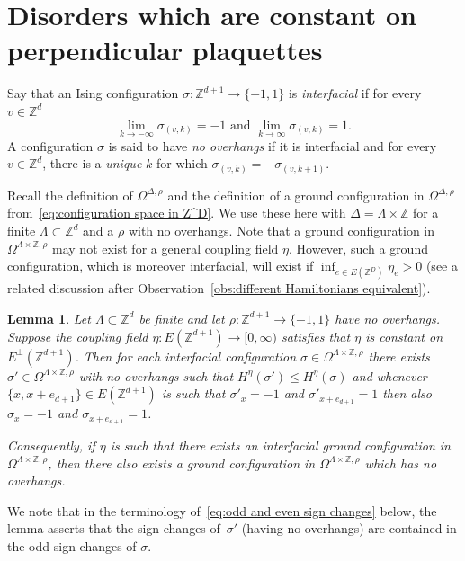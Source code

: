 \documentclass[11pt, reqno]{amsart}
\newtheorem{lemma}[theorem]{Lemma}
\newcommand{\Z}{\mathbb{Z}}
\numberwithin{equation}{section}
\begin{document}
\section{Disorders which are constant on perpendicular plaquettes}
\label{sec:Disorders which are constant on transversal plaquettes}

Say that an Ising configuration $\sigma\colon \Z^{d+1}\to\{-1,1\}$ is \emph{interfacial} if for every $v\in\Z^d$
\begin{equation}
\text{$\lim_{k\to-\infty}\sigma_{(v,k)}=-1$ and $\lim_{k\to\infty}\sigma_{(v,k)}=1$}.
\end{equation}
A configuration $\sigma$ is said to have \emph{no overhangs} if it is interfacial and for every $v\in\Z^d$, there is a \emph{unique} $k$ for which $\sigma_{(v,k)}=-\sigma_{(v,k+1)}$.

Recall the definition of $\Omega^{\Delta,\rho}$ and the definition of a ground configuration in $\Omega^{\Delta, \rho}$ from~\eqref{eq:configuration space in Z^D}. We use these here with $\Delta = \Lambda\times\Z$ for a finite $\Lambda\subset\Z^d$ and a $\rho$ with no overhangs. Note that a ground configuration in $\Omega^{\Lambda\times\Z,\rho}$ may not exist for a general coupling field $\eta$. However, such a ground configuration, which is moreover interfacial, will exist if $\inf_{e\in E(\Z^D)}\eta_e>0$ (see a related discussion after Observation~\ref{obs:different Hamiltonians equivalent}).

\begin{lemma}\label{lem:ground configuration with no overhangs}
Let $\Lambda\subset\Z^d$ be finite and let $\rho\colon \Z^{d+1}\to\{-1,1\}$ have no overhangs. Suppose the coupling field  $\eta\colon E(\Z^{d+1})\to[0,\infty)$ satisfies that $\eta$ is \emph{constant} on $E^{\perp}(\Z^{d+1})$. Then for each interfacial configuration $\sigma\in\Omega^{\Lambda\times\Z,\rho}$ there exists $\sigma'\in\Omega^{\Lambda\times\Z,\rho}$ \emph{with no overhangs} such that $H^\eta(\sigma')\le H^\eta(\sigma)$ and whenever $\{x,x+e_{d+1}\}\in E(\Z^{d+1})$ is such that $\sigma'_{x}=-1$ and $\sigma'_{x+e_{d+1}}=1$ then also $\sigma_{x}=-1$ and $\sigma_{x+e_{d+1}}=1$.
 
Consequently, if $\eta$ is such that there exists an interfacial ground configuration in $\Omega^{\Lambda\times\Z,\rho}$, then there also exists a ground configuration in $\Omega^{\Lambda\times\Z,\rho}$ which has no overhangs.
 
\end{lemma}
We note that in the terminology of~\eqref{eq:odd and even sign changes} below, the lemma asserts that the sign changes of~$\sigma'$ (having no overhangs) are contained in the odd sign changes of $\sigma$.
\end{document}
